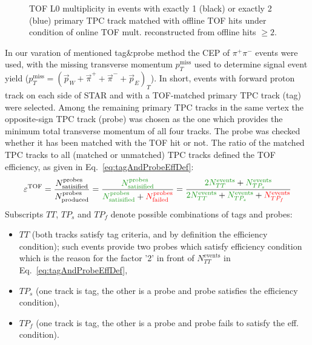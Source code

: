 \begin{figure}[b!]
\begin{minipage}{.4725\textwidth}
  \caption[TOF L0 multiplicity distribution for events with multiplicity reconstructed from offline hits $\geq 2$.]
   {TOF L0 multiplicity in events with exactly 1 (black) or exactly 2 (blue) primary TPC track matched with offline TOF hits under condition of online TOF mult. reconstructed from offline hits $\geq 2$.}%
   \label{fig:tofTrigEffTagAndProbe}%
\end{minipage}%
\end{figure}%

In our varation of mentioned tag\&probe method the CEP of $\pi^{+}\pi^{-}$ events were used, with the missing transverse momentum $p_{T}^{\text{miss}}$ used to determine signal event yield ($p_{T}^{\text{miss}}=(\vec{p}_{W}+\vec{\pi}^{+}+\vec{\pi}^{-}+\vec{p}_{E})_{T}$). In short, events with forward proton track on each side of STAR and with a TOF-matched primary TPC track (tag) were selected. Among the remaining primary TPC tracks in the same vertex the opposite-sign TPC track (probe) was chosen as the one which provides the minimum total transverse momentum of all four tracks. The probe was checked whether it has been matched with the TOF hit or not. The ratio of the matched TPC tracks to all (matched or unmatched) TPC tracks defined the TOF efficiency, as given in Eq.~\eqref{eq:tagAndProbeEffDef}:%
\begin{equation}\label{eq:tagAndProbeEffDef}%
\varepsilon^{\text{TOF}}=\frac{N^{\text{probes}}_{\text{satisified}}}{N^{\text{probes}}_{\text{produced}}} = \frac{\textcolor{dgreen}{N^{\text{probes}}_{\text{satisified}}}}{\textcolor{dgreen}{N^{\text{probes}}_{\text{satisified}}}+\textcolor{red}{N^{\text{probes}}_{\text{failed}}}} = \frac{\textcolor{dgreen}{2 N^{\text{events}}_{TT}} + \textcolor{dgreen}{N^{\text{events}}_{TP_{s}}}}{\textcolor{dgreen}{2 N^{\text{events}}_{TT}} + \textcolor{dgreen}{N^{\text{events}}_{TP_{s}}} + \textcolor{red}{N^{\text{events}}_{TP_{f}}}}
\end{equation}%
Subscripts $TT$, $TP_{s}$ and $TP_{f}$ denote possible combinations of tags and probes:\\[-17pt]
\begin{itemize}%
 \item $TT$ (both tracks satisfy tag criteria, and by definition the efficiency condition); such events provide two probes which satisfy efficiency condition which is the reason for the factor '2' in front of $N^{\text{events}}_{TT}$ in Eq.~\eqref{eq:tagAndProbeEffDef},\\[-17pt]
 \item $TP_{s}$ (one track is tag, the other is a probe and probe satisfies the efficiency condition),\\[-17pt]
 \item $TP_{f}$ (one track is tag, the other is a probe and probe fails to satisfy the eff. condition).%
\end{itemize}%
